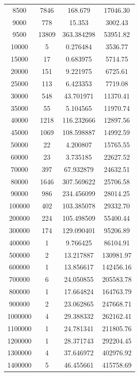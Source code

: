 \documentclass[11pt]{article}
\begin{document}
\begin{center}
\begin{longtable}{|c|c|c|c|}
8500        & 7846     & 168.679   & 17046.30 \\
9000        & 778      & 15.353    & 3002.43 \\
9500        & 13809    & 363.384298& 53951.82 \\
10000       & 5        & 0.276484  & 3536.77 \\
15000       & 17       & 0.683975  & 5714.75 \\
20000       & 151      & 9.221975  & 6725.61 \\
25000       & 113      & 6.423353  & 7719.08 \\
30000       & 548      & 43.701971 & 11370.41 \\
35000       & 55       & 5.104565  & 11970.74 \\
40000       & 1218     & 116.232666& 12897.56 \\
45000       & 1069     & 108.598887& 14992.59 \\
50000       & 22       & 4.200807  & 15765.55 \\
60000       & 23       & 3.735185  & 22627.52 \\
70000       & 397      & 67.932879 & 24632.51 \\
80000       & 1646     & 307.569622& 25706.58 \\
90000       & 986      & 234.456099& 28014.25 \\
100000      & 402      & 103.385078 & 29332.70 \\
200000      & 224      & 105.498509 & 55400.44 \\
300000      & 174      & 129.090401 & 95206.89 \\
400000      & 1        & 9.766425   & 86104.91 \\
500000      & 2        & 13.217887  & 130981.97 \\
600000      & 1        & 13.856617  & 142456.16 \\
700000      & 6        & 24.050855  & 205583.78 \\
800000      & 1        & 17.664824  & 164763.79 \\
900000      & 2        & 23.062865  & 247668.71 \\
1000000     & 4        & 29.388332  & 262162.41 \\
1100000     & 1        & 24.781341  & 211805.76 \\
1200000     & 1        & 28.371743  & 292204.45 \\
1300000     & 4        & 37.646972  & 402976.92 \\
1400000     & 5        & 46.455661  & 415758.69 \\

\end{longtable}
\end{center}
\end{document}
